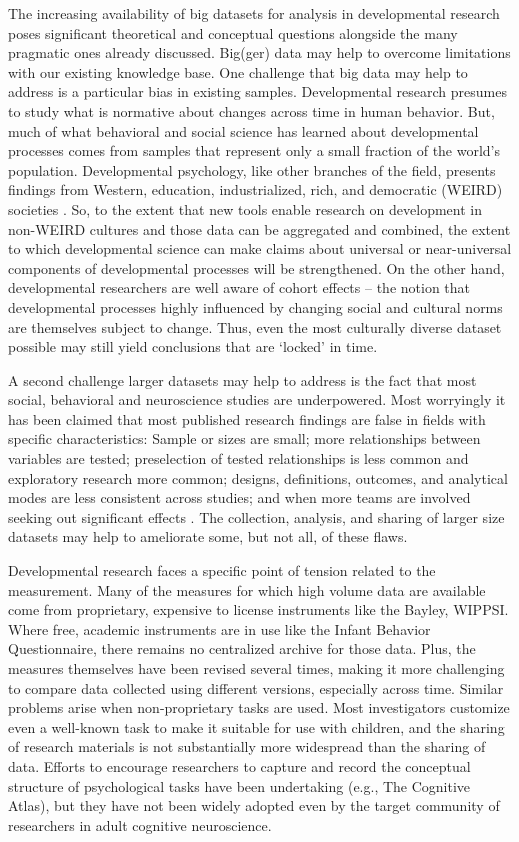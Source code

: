 \documentclass[letterpaper,man,apacite]{apa6}
\begin{document}
The increasing availability of big datasets for analysis in developmental research poses significant theoretical and conceptual questions alongside the many pragmatic ones already discussed.
Big(ger) data may help to overcome limitations with our existing knowledge base.
One challenge that big data may help to address is a particular bias in existing samples.
Developmental research presumes to study what is normative about changes across time in human behavior.
But, much of what behavioral and social science has learned about developmental processes comes from samples that represent only a small fraction of the world's population.
Developmental psychology, like other branches of the field, presents findings from Western, education, industrialized, rich, and democratic (WEIRD) societies \cite{henrich_weirdest_2010}.
So, to the extent that new tools enable research on development in non-WEIRD cultures and those data can be aggregated and combined, the extent to which developmental science can make claims about universal or near-universal components of developmental processes will be strengthened.
On the other hand, developmental researchers are well aware of cohort effects -- the notion that developmental processes highly influenced by changing social and cultural norms are themselves subject to change.
Thus, even the most culturally diverse dataset possible may still yield conclusions that are `locked' in time.

A second challenge larger datasets may help to address is the fact that most social, behavioral \cite{Maxwell-2004} and neuroscience studies \cite{Button-NRN} are underpowered.
Most worryingly it has been claimed that most published research findings are false in fields with specific characteristics: Sample or sizes are small; more relationships between variables are tested; preselection of tested relationships is less common and exploratory research more common; designs, definitions, outcomes, and analytical modes are less consistent across studies; and when more teams are involved seeking out significant effects \cite{Ioanidis}.
The collection, analysis, and sharing of larger size datasets may help to ameliorate some, but not all, of these flaws.

Developmental research faces a specific point of tension related to the measurement.
Many of the measures for which high volume data are available come from proprietary, expensive to license instruments like the Bayley, WIPPSI.
Where free, academic instruments are in use like the Infant Behavior Questionnaire, there remains no centralized archive for those data.
Plus, the measures themselves have been revised several times, making it more challenging to compare data collected using different versions, especially across time.
Similar problems arise when non-proprietary tasks are used.
Most investigators customize even a well-known task to make it suitable for use with children, and the sharing of research materials is not substantially more widespread than the sharing of data.
Efforts to encourage researchers to capture and record the conceptual structure of psychological tasks have been undertaking (e.g., The Cognitive Atlas), but they have not been widely adopted even by the target community of researchers in adult cognitive neuroscience.
\end{document}
